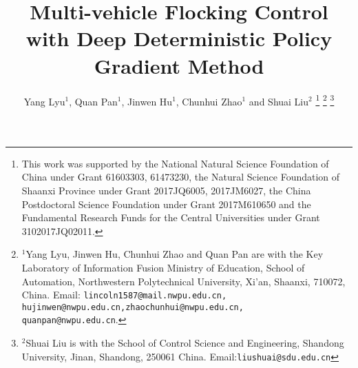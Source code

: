\documentclass[letterpaper,10 pt,conference]{ieeeconf}
\begin{document}
%
\title{\Large \bf Multi-vehicle Flocking Control with Deep Deterministic Policy Gradient  Method}
%
%
%
\author{Yang Lyu$^{1}$, Quan Pan$^{1}$, Jinwen Hu$^{1}$, Chunhui Zhao$^{1}$ and Shuai Liu$^{2}$
\thanks{This work was supported by the National Natural Science Foundation of China under Grant 61603303, 61473230, the Natural Science Foundation of Shaanxi Province under Grant 2017JQ6005, 2017JM6027, the China Postdoctoral Science Foundation under Grant 2017M610650 and the Fundamental Research Funds for the Central Universities under Grant 3102017JQ02011.} 
\thanks{$^{1}$Yang Lyu, Jinwen Hu,  Chunhui Zhao and Quan Pan are with the Key Laboratory of Information Fusion Ministry of Education, School of Automation, Northwestern Polytechnical University, Xi'an, Shaanxi, 710072, China.
	Email: {\tt\small lincoln1587@mail.nwpu.edu.cn, hujinwen@nwpu.edu.cn,zhaochunhui@nwpu.edu.cn, quanpan@nwpu.edu.cn}. }
\thanks{$^{2}$Shuai Liu is with the School of Control Science and Engineering, Shandong University, Jinan, Shandong, 250061 China. Email:{\tt \small liushuai@sdu.edu.cn}}
}

	
\end{document}
